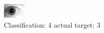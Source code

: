 \begin{figure}[h!]
\begin{center}
\includegraphics[width=0.60\columnwidth]{figures/ID1974_class_4_target_3.png}
\end{center}
\caption{ Classification: 4 actual target: 3}
\label{fig:ID1974_class_4_target_3}
\end{figure}
